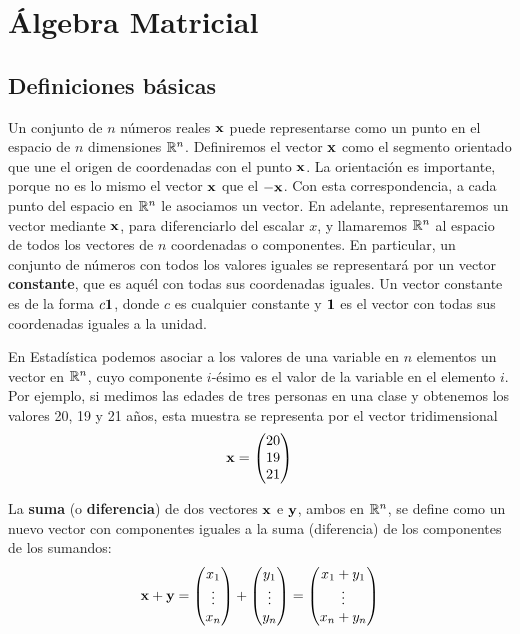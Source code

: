 \chapter{Álgebra Matricial}

\section{Definiciones básicas}

Un conjunto de $n$ números reales $\mathbf{x}$ puede representarse como un punto en el espacio de $n$ dimensiones $\mathbb{R}^n$. Definiremos el vector $\mathbf{x}$ como el segmento orientado que une el origen de coordenadas con el punto $\mathbf{x}$. La orientación es importante, porque no es lo mismo el vector $\mathbf{x}$ que el $-\mathbf{x}$. Con esta correspondencia, a cada punto del espacio en $\mathbb{R}^n$ le asociamos un vector. En adelante, representaremos un vector mediante $\mathbf{x}$, para diferenciarlo del escalar $x$, y llamaremos $\mathbb{R}^n$ al espacio de todos los vectores de $n$ coordenadas o componentes. En particular, un conjunto de números con todos los valores iguales se representará por un vector \textbf{constante}, que es aquél con todas sus coordenadas iguales. Un vector constante es de la forma $c\mathbf{1}$, donde $c$ es cualquier constante y $\mathbf{1}$ es el vector con todas sus coordenadas iguales a la unidad.

En Estadística podemos asociar a los valores de una variable en $n$ elementos un vector en $\mathbb{R}^n$, cuyo componente $i$-ésimo es el valor de la variable en el elemento $i$. Por ejemplo, si medimos las edades de tres personas en una clase y obtenemos los valores 20, 19 y 21 años, esta muestra se representa por el vector tridimensional
$$\mathbf{x}=\begin{pmatrix}
    20 \\
    19 \\
    21
\end{pmatrix}$$

La \textbf{suma} (o \textbf{diferencia}) de dos vectores $\mathbf{x}$ e $\mathbf{y}$, ambos en $\mathbb{R}^n$, se define como un nuevo vector con componentes iguales a la suma (diferencia) de los componentes de los sumandos:
$$\mathbf{x} + \mathbf{y}=\begin{pmatrix}
    x_1 \\
    \vdots \\
    x_n
\end{pmatrix}+
\begin{pmatrix}
    y_1 \\
    \vdots \\
    y_n
\end{pmatrix} =
\begin{pmatrix}
    x_1 + y_1 \\
    \vdots \\
    x_n + y_n
\end{pmatrix}$$

